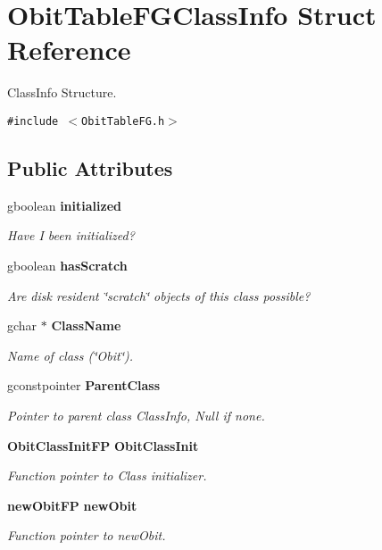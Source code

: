 \section{Obit\-Table\-FGClass\-Info Struct Reference}
\label{structObitTableFGClassInfo}
Class\-Info Structure.  


{\tt \#include $<$Obit\-Table\-FG.h$>$}

\subsection*{Public Attributes}
\begin{CompactItemize}
\item 
gboolean {\bf initialized}
\begin{CompactList}\small\item\em Have I been initialized? \item\end{CompactList}\item 
gboolean {\bf has\-Scratch}
\begin{CompactList}\small\item\em Are disk resident \char`\"{}scratch\char`\"{} objects of this class possible? \item\end{CompactList}\item 
gchar $\ast$ {\bf Class\-Name}
\begin{CompactList}\small\item\em Name of class (\char`\"{}Obit\char`\"{}). \item\end{CompactList}\item 
gconstpointer {\bf Parent\-Class}
\begin{CompactList}\small\item\em Pointer to parent class Class\-Info, Null if none. \item\end{CompactList}\item 
{\bf Obit\-Class\-Init\-FP} {\bf Obit\-Class\-Init}
\begin{CompactList}\small\item\em Function pointer to Class initializer. \item\end{CompactList}\item 
{\bf new\-Obit\-FP} {\bf new\-Obit}
\begin{CompactList}\small\item\em Function pointer to new\-Obit. \item\end{CompactList}\item 

\end{CompactItemize}
